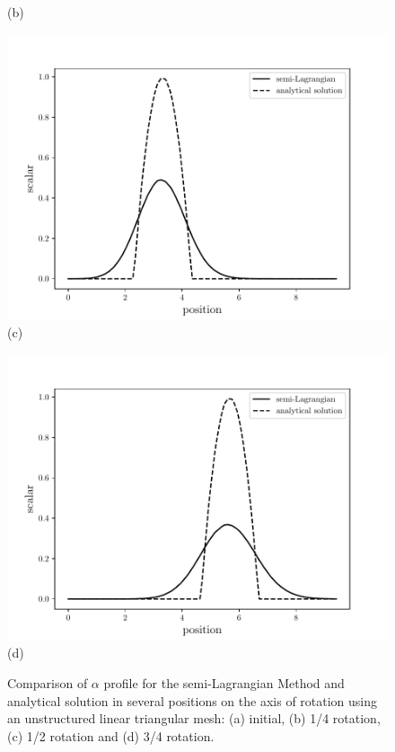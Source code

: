 \begin{center}
\begin{figure}[H]
\begin{minipage}{.5\linewidth}
      (b)
     \end{minipage}
     \begin{minipage}{.5\linewidth}
      \centering
      \includegraphics[scale=0.53]{./02_chaps/cap_validation/figure/SLlinear2.pdf}\\
      (c)
     \end{minipage}%
     \begin{minipage}{.5\linewidth}
      \centering
      \includegraphics[scale=0.53]{./02_chaps/cap_validation/figure/SLlinear3.pdf}\\
      (d)
     \end{minipage}
     \medskip
     \caption{Comparison of $\alpha$ profile for the semi-Lagrangian Method and analytical solution in several positions on the axis of rotation using an unstructured linear triangular mesh: 
     (a) initial, 
     (b) 1/4 rotation,
     (c) 1/2 rotation and
     (d) 3/4 rotation.}
     \label{SL linear}
\end{figure}
\end{center}


